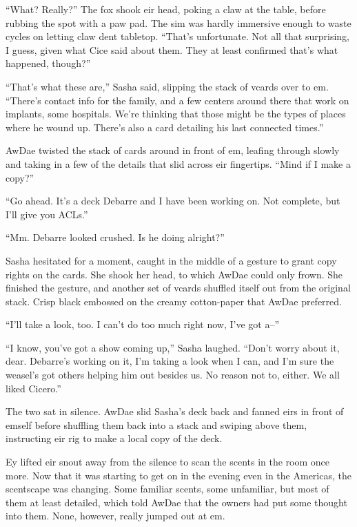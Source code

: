 ``What? Really?'' The fox shook eir head, poking a claw at the table, before rubbing the spot with a paw pad. The sim was hardly immersive enough to waste cycles on letting claw dent tabletop. ``That's unfortunate. Not all that surprising, I guess, given what Cice said about them. They at least confirmed that's what happened, though?''

``That's what these are,'' Sasha said, slipping the stack of vcards over to em. ``There's contact info for the family, and a few centers around there that work on implants, some hospitals. We're thinking that those might be the types of places where he wound up. There's also a card detailing his last connected times.''

AwDae twisted the stack of cards around in front of em, leafing through slowly and taking in a few of the details that slid across eir fingertips. ``Mind if I make a copy?''

``Go ahead. It's a deck Debarre and I have been working on. Not complete, but I'll give you ACLs.''

``Mm. Debarre looked crushed. Is he doing alright?''

Sasha hesitated for a moment, caught in the middle of a gesture to grant copy rights on the cards. She shook her head, to which AwDae could only frown. She finished the gesture, and another set of vcards shuffled itself out from the original stack. Crisp black embossed on the creamy cotton-paper that AwDae preferred.

``I'll take a look, too. I can't do too much right now, I've got a--''

``I know, you've got a show coming up,'' Sasha laughed. ``Don't worry about it, dear. Debarre's working on it, I'm taking a look when I can, and I'm sure the weasel's got others helping him out besides us. No reason not to, either. We all liked Cicero.''

The two sat in silence. AwDae slid Sasha's deck back and fanned eirs in front of emself before shuffling them back into a stack and swiping above them, instructing eir rig to make a local copy of the deck.

Ey lifted eir snout away from the silence to scan the scents in the room once more. Now that it was starting to get on in the evening even in the Americas, the scentscape was changing. Some familiar scents, some unfamiliar, but most of them at least detailed, which told AwDae that the owners had put some thought into them. None, however, really jumped out at em.

